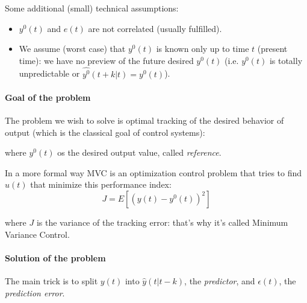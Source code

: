Some additional (small) technical assumptions:
\begin{itemize}
    \item $y^0(t)$ and $e(t)$ are not correlated (usually fulfilled).
    \item We assume (worst case) that $y^0(t)$ is known only up to time $t$ (present time): we have no preview of the future desired $y^0(t)$ (i.e. $y^0(t)$ is totally unpredictable or $\hat{y^0}(t+k|t) = y^0(t)$).
\end{itemize}

\paragraph{Goal of the problem} 
The problem we wish to solve is optimal tracking of the desired behavior of output (which is the classical goal of control systems):
\begin{figure}[H]
    \centering
\end{figure}
where $y^0(t)$ os the desired output value, called \emph{reference}. 

In a more formal way MVC is an optimization control problem that tries to find $u(t)$ that minimize this performance index:
\[
    J = E\left[ (y(t) - y^0(t))^2 \right]
\]

where $J$ is the variance of the tracking error: that's why it's called Minimum Variance Control.

\paragraph{Solution of the problem}
The main trick is to split $y(t)$ into $\hat{y}(t|t-k)$, the \emph{predictor}, and $\epsilon(t)$, the \emph{prediction error}.

